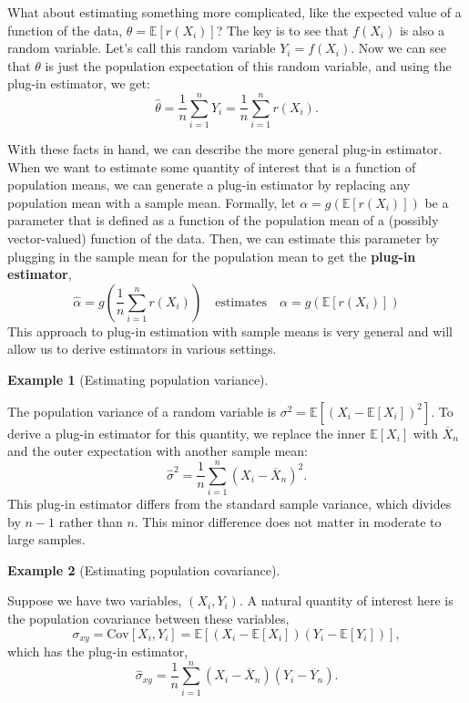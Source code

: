 \documentclass[
  letterpaper,
  DIV=11,
  numbers=noendperiod]{scrreprt}
\newcommand{\E}{\mathbb{E}}
\newcommand{\Xbar}{\overline{X}}
\newcommand{\Ybar}{\overline{Y}}
\theoremstyle{definition}
\theoremstyle{plain}
\theoremstyle{definition}
\newtheorem{example}{Example}[chapter]
\theoremstyle{remark}
\begin{document}
What about estimating something more complicated, like the expected
value of a function of the data, \(\theta = \E[r(X_i)]\)? The key is to
see that \(f(X_i)\) is also a random variable. Let's call this random
variable \(Y_i = f(X_i)\). Now we can see that \(\theta\) is just the
population expectation of this random variable, and using the plug-in
estimator, we get: \[
\widehat{\theta} = \frac{1}{n} \sum_{i=1}^n Y_i = \frac{1}{n} \sum_{i=1}^n r(X_i). 
\]

With these facts in hand, we can describe the more general plug-in
estimator. When we want to estimate some quantity of interest that is a
function of population means, we can generate a plug-in estimator by
replacing any population mean with a sample mean. Formally, let
\(\alpha = g\left(\E[r(X_i)]\right)\) be a parameter that is defined as
a function of the population mean of a (possibly vector-valued) function
of the data. Then, we can estimate this parameter by plugging in the
sample mean for the population mean to get the \textbf{plug-in
estimator}, \[
\widehat{\alpha} = g\left( \frac{1}{n} \sum_{i=1}^n r(X_i) \right) \quad \text{estimates} \quad \alpha = g\left(\E[r(X_i)]\right)
\] This approach to plug-in estimation with sample means is very general
and will allow us to derive estimators in various settings.

\begin{example}[Estimating population
variance]\protect\hypertarget{exm-var-est}{}\label{exm-var-est}

The population variance of a random variable is
\(\sigma^2 = \E[(X_i - \E[X_i])^2]\). To derive a plug-in estimator for
this quantity, we replace the inner \(\E[X_i]\) with \(\Xbar_n\) and the
outer expectation with another sample mean: \[
\widehat{\sigma}^2 = \frac{1}{n} \sum_{i=1}^n (X_i - \Xbar_n)^2.
\] This plug-in estimator differs from the standard sample variance,
which divides by \(n - 1\) rather than \(n\). This minor difference does
not matter in moderate to large samples.

\end{example}

\begin{example}[Estimating population
covariance]\protect\hypertarget{exm-cov-est}{}\label{exm-cov-est}

Suppose we have two variables, \((X_i, Y_i)\). A natural quantity of
interest here is the population covariance between these variables, \[
\sigma_{xy} = \text{Cov}[X_i,Y_i] = \E[(X_i - \E[X_i])(Y_i-\E[Y_i])],
\] which has the plug-in estimator, \[
\widehat{\sigma}_{xy} = \frac{1}{n} \sum_{i=1}^n (X_i - \Xbar_n)(Y_i - \Ybar_n).
\]

\end{example}
\end{document}
